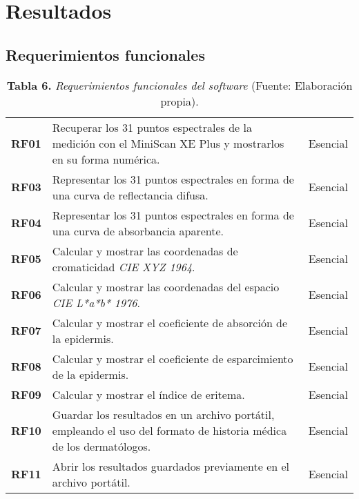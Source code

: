 \chapter{Resultados}

\section{Requerimientos funcionales}
\FloatBarrier
	\begin{table}[htb]
		\small
		\caption{\textbf{Tabla 6.} \textit{Requerimientos funcionales del software} (Fuente: Elaboraci\'{o}n propia).}
		\centering
		\setlength{\extrarowheight}{5pt}
		\begin{tabulary}{\anchotabla}{|c|L|c|}
			\hline
			 &  & \\ \hline
			\textbf{RF01} & Recuperar los 31 puntos espectrales de la medici\'{o}n con el MiniScan XE Plus y mostrarlos en su forma num\'{e}rica. & Esencial\\ \hline

			\textbf{RF03} & Representar los 31 puntos espectrales en forma de una curva de reflectancia difusa. & Esencial\\ \hline
			\textbf{RF04} & Representar los 31 puntos espectrales en forma de una curva de absorbancia aparente. & Esencial\\ \hline
			\textbf{RF05} & Calcular y mostrar las coordenadas de cromaticidad \textit{CIE XYZ 1964}. & Esencial\\ \hline
			\textbf{RF06} & Calcular y mostrar las coordenadas del espacio \textit{CIE L*a*b* 1976}. & Esencial\\ \hline
			\textbf{RF07} & Calcular y mostrar el coeficiente de absorci\'{o}n de la epidermis. & Esencial\\ \hline
			\textbf{RF08} & Calcular y mostrar el coeficiente de esparcimiento de la epidermis. & Esencial\\ \hline
			\textbf{RF09} & Calcular y mostrar el \'{i}ndice de eritema. & Esencial\\ \hline
			\textbf{RF10} & Guardar los resultados en un archivo port\'{a}til, empleando el uso del formato de historia m\'{e}dica de los dermat\'{o}logos. & Esencial\\ \hline
			\textbf{RF11} & Abrir los resultados guardados previamente en el archivo port\'{a}til. & Esencial\\ \hline
		\end{tabulary}
	\end{table}
\FloatBarrier %

